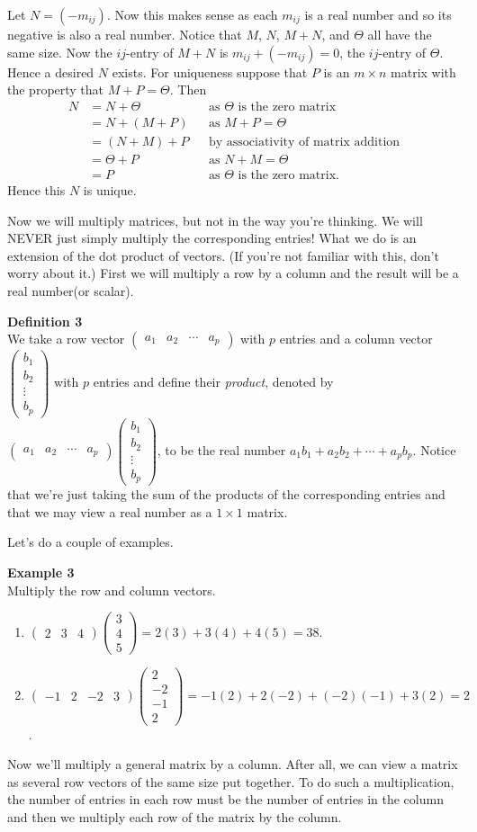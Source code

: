 \documentclass[12pt]{article}
\def\it{\item}
\def\be{\begin{enumerate}} \def\ee{\end{enumerate}}
\def\lp{\left(} \def\rp{\right)} \def\abs#1{\vert #1 \vert}
\def\colth#1#2#3{\lp \begin{array}{rrr} #1 \\ #2 \\ #3 \end{array} \rp}
\def\colf#1#2#3#4{\lp \begin{array}{rrrr} #1 \\ #2 \\ #3 \\ #4 \end{array} \rp}
\def\colp#1{\begin{pmatrix} #1_1 \\ #1_2 \\ \vdots \\ #1_p \end{pmatrix}}
\def\rowp#1{\begin{pmatrix} #1_1 & #1_2 & \cdots & #1_p \end{pmatrix}}
\def\rowth#1#2#3{\begin{pmatrix} #1 & #2 & #3 \end{pmatrix}}
\def\rowf#1#2#3#4{\begin{pmatrix} #1 & #2 & #3 & #4 \end{pmatrix}}
\begin{document}
Let $N = (-m_{ij})$. Now this makes sense as each $m_{ij}$ is a real number and so its negative is also a real number. Notice that $M$, $N$, $M + N$, and $\Theta$ all have the same size. Now the $ij$-entry of $M + N$ is $m_{ij} + (-m_{ij}) = 0$, the $ij$-entry of $\Theta$. Hence a desired $N$ exists. For uniqueness suppose that $P$ is an $m \times n$ matrix with the property that $M + P = \Theta$. Then 
\begin{align*}
N &= N + \Theta && \text{as $\Theta$ is the zero matrix} \\
  &= N + (M + P) && \text{as $M + P = \Theta$} \\
  &= (N + M) + P && \text{by associativity of matrix addition} \\
  &= \Theta + P && \text{as $N + M = \Theta$} \\
  &= P && \text{as $\Theta$ is the zero matrix}.
\end{align*}
Hence this $N$ is unique.

Now we will multiply matrices, but not in the way you're thinking. We will NEVER just simply multiply the corresponding entries! What we do is an extension of the dot product of vectors. (If you're not familiar with this, don't worry about it.) First we will multiply a row by a column and the result will be a real number(or scalar).

\begin{framed}
{\bf Definition 3} \\
We take a row vector $\rowp{a}$ with $p$ entries and a column vector $\colp{b}$ with $p$ entries and define their {\itshape product}, denoted by 
$\rowp{a} \colp{b}$, to be the real number $a_1 b_1 + a_2 b_2 + \cdots + a_p b_p$. Notice that we're just taking the sum of the products of the corresponding entries and that we may view a real number as a $1 \times 1$ matrix.
\end{framed}

Let's do a couple of examples.

{\bf Example 3} \\
Multiply the row and column vectors.
\be
\it $\rowth{2}{3}{4} \colth{3}{4}{5} = 2(3) + 3(4) + 4(5) = 38$.
\it $\rowf{-1}{2}{-2}{3} \colf{2}{-2}{-1}{2} = -1(2) + 2(-2) + (-2)(-1) + 3(2) = 2$.
\ee

Now we'll multiply a general matrix by a column. After all, we can view a matrix as several row vectors of the same size put together. To do such a multiplication, the number of entries in each row must be the number of entries in the column and then we multiply each row of the matrix by the column. 
\end{document}
